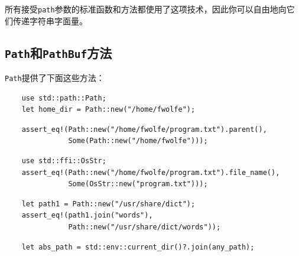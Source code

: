 所有接受\texttt{path}参数的标准函数和方法都使用了这项技术，因此你可以自由地向它们传递字符串字面量。

\subsection{\texttt{Path}和\texttt{PathBuf}方法}
\texttt{Path}提供了下面这些方法：
\begin{verbatim}
    use std::path::Path;
    let home_dir = Path::new("/home/fwolfe");
\end{verbatim}

\begin{verbatim}
    assert_eq!(Path::new("/home/fwolfe/program.txt").parent(),
               Some(Path::new("/home/fwolfe")));
\end{verbatim}

\begin{verbatim}
    use std::ffi::OsStr;
    assert_eq!(Path::new("/home/fwolfe/program.txt").file_name(),
               Some(OsStr::new("program.txt")));
\end{verbatim}


\begin{verbatim}
    let path1 = Path::new("/usr/share/dict");
    assert_eq!(path1.join("words"),
               Path::new("/usr/share/dict/words"));
\end{verbatim}
\begin{verbatim}
    let abs_path = std::env::current_dir()?.join(any_path);
\end{verbatim}

